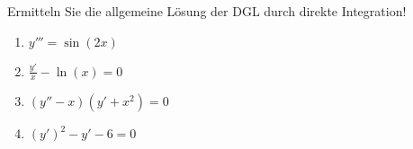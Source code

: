 \item Ermitteln Sie die allgemeine Lösung der DGL durch direkte Integration!
\begin{multicols}{2}
\begin{enumerate}
	\item $y''' = \sin(2x)$
	\item $\frac{y'}{x}-\ln(x) = 0$
	\item $(y''-x)(y'+x^2)=0$
	\item $(y')^2-y'-6=0$
\end{enumerate}
\end{multicols}